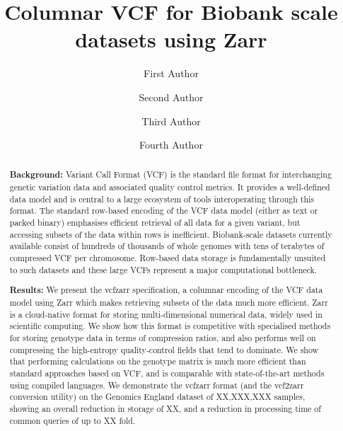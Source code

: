 \documentclass[a4paper,num-refs]{oup-contemporary}
\title{Columnar VCF for Biobank scale datasets using Zarr}
\author[1,\authfn{1},\authfn{2}]{First Author}
\author[2,\authfn{1},\authfn{2}]{Second Author}
\author[2]{Third Author}
\author[2,\authfn{1}]{Fourth Author}
\affil[1]{First Institution}
\affil[2]{Second Institution}
\begin{document}
\begin{frontmatter}
\maketitle


\begin{abstract}
\textbf{Background:}
Variant Call Format (VCF) is the standard file format for interchanging
genetic variation data and associated quality control metrics.
It provides a well-defined data model and is central to a large ecosystem
of tools interoperating through this format.
The standard row-based encoding of the VCF data model (either as text
or packed binary) emphasises efficient retrieval of all data for a given
variant, but accessing subsets of the data within rows is inefficient.
Biobank-scale datasets currently available 
consist of hundreds of thousands of whole genomes with tens of terabytes
of compressed VCF per chromosome.
Row-based data storage is fundamentally unsuited to such datasets
and these large VCFs represent a major computational bottleneck.

\textbf{Results:}
We present the vcfzarr specification, a columnar encoding of the 
VCF data model using Zarr which makes retrieving subsets of the 
data much more efficient. Zarr is a cloud-native format for storing 
multi-dimensional numerical data, widely used in scientific computing.
We show how this format is competitive with specialised methods for 
storing genotype data in terms of compression ratios, and also performs
well on compressing the high-entropy quality-control fields that 
tend to dominate. We show that performing calculations on the genotype
matrix is much more efficient than standard
approaches based on VCF, and is comparable with state-of-the-art methods
using compiled languages. We demonstrate 
the vcfzarr format (and the vcf2zarr conversion utility) 
on the Genomics England dataset of XX,XXX,XXX samples, showing
an overall reduction in storage of XX, and a reduction in processing 
time of common queries of up to XX fold.


\end{abstract}
\end{frontmatter}
\end{document}
